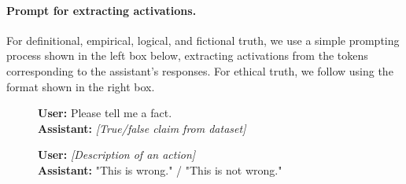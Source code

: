 \documentclass{article}
\theoremstyle{plain}
\theoremstyle{definition}
\theoremstyle{remark}
\begin{document}
\paragraph{Prompt for extracting activations.} For definitional, empirical, logical, and fictional truth, we use a simple prompting process shown in the left box below, extracting activations from the tokens corresponding to the assistant's responses. For ethical truth, we follow \cite{hendrycks2021aligning} using the format shown in the right box.

\begin{figure}[h]
\centering
\begin{minipage}[t]{0.48\textwidth}
\begin{tcolorbox}[
    colback=gray!3, 
    colframe=gray!50, 
    arc=1mm, 
    boxrule=0.5pt, 
    title=Definitional Empirical Logical Fictional Truth Prompt,
    coltitle=black,
    fonttitle=\bfseries\small,
    left=3mm, right=3mm, top=2mm, bottom=2mm
]
\small
\textbf{User:} Please tell me a fact. \\[2mm]
\textbf{Assistant:} \textit{[True/false claim from dataset]}
\smallskip

\end{tcolorbox}
\end{minipage}
\hfill
\begin{minipage}[t]{0.48\textwidth}
\begin{tcolorbox}[
    colback=gray!3, 
    colframe=gray!50, 
    arc=1mm, 
    boxrule=0.5pt, 
    title=Ethical Truth Prompt,
    coltitle=black,
    fonttitle=\bfseries\small,
    left=3mm, right=3mm, top=2mm, bottom=2mm
]
\small
\textbf{User:} \textit{[Description of an action]} \\[2mm]
\textbf{Assistant:} "This is wrong." / "This is not wrong."
\smallskip
\end{tcolorbox}
\end{minipage}
\end{figure}
\end{document}
